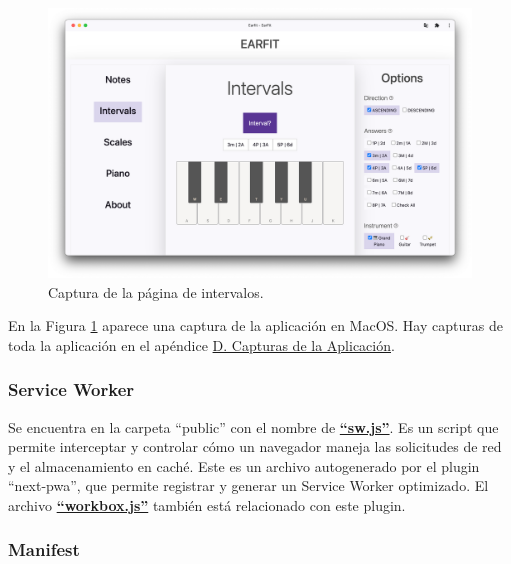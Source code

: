 \documentclass[12pt,twoside,titlepage]{report}
\begin{document}
\begin{figure}[H]
    \centering
    \includegraphics[width=\textwidth]{Capturas Earfit/PC/Intervals}
    \caption{Captura de la página de intervalos.}
    \label{fig:PCIntervals1}
\end{figure}

En la Figura \ref{fig:PCIntervals1} aparece una captura de la aplicación en MacOS. Hay capturas de toda la aplicación en el apéndice \hyperref[sec:Capturas]{D. Capturas de la Aplicación}.

\subsubsection{Service Worker}
\label{sec:serviceWorker}

Se encuentra en la carpeta ``public'' con el nombre de \href{https://github.com/alberttogoca/EarFit/blob/main/public/sw.js}{\textbf{``sw.js''}}. Es un script que permite interceptar y controlar cómo un navegador maneja las solicitudes de red y el almacenamiento en caché. Este es un archivo autogenerado por el plugin ``next-pwa'', que permite registrar y generar un Service Worker optimizado. El archivo \href{https://github.com/alberttogoca/EarFit/blob/main/public/workbox-1846d813.js}{\textbf{``workbox.js''}} también está relacionado con este plugin.
\cite{serviceworker}

\subsubsection{Manifest}
\label{sec:manifest}
\end{document}
